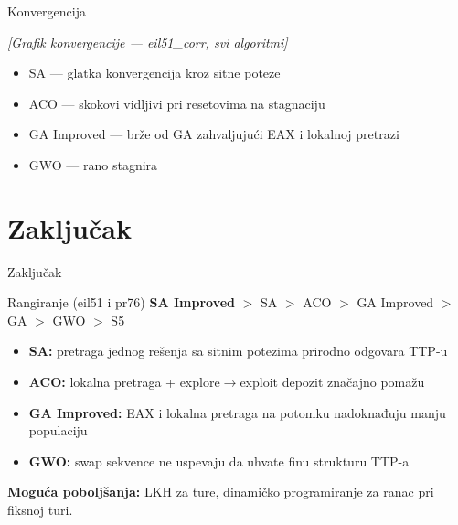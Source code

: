 \documentclass[aspectratio=169]{beamer}
\begin{document}
\begin{frame}{Konvergencija}
  \begin{center}
    \textit{[Grafik konvergencije --- eil51\_corr, svi algoritmi]}
  \end{center}

  \begin{itemize}
    \item SA --- glatka konvergencija kroz sitne poteze
    \item ACO --- skokovi vidljivi pri resetovima na stagnaciju
    \item GA Improved --- brže od GA zahvaljujući EAX i lokalnoj pretrazi
    \item GWO --- rano stagnira
  \end{itemize}
\end{frame}

\section{Zaključak}

\begin{frame}{Zaključak}
  \begin{block}{Rangiranje (eil51 i pr76)}
    \textbf{SA Improved} $>$ SA $>$ ACO $>$ GA Improved $>$ GA $>$ GWO $>$ S5
  \end{block}

  \bigskip
  \begin{itemize}
    \item \textbf{SA:} pretraga jednog rešenja sa sitnim potezima prirodno odgovara TTP-u
    \item \textbf{ACO:} lokalna pretraga + explore$\to$exploit depozit značajno pomažu
    \item \textbf{GA Improved:} EAX i lokalna pretraga na potomku nadoknađuju manju populaciju
    \item \textbf{GWO:} swap sekvence ne uspevaju da uhvate finu strukturu TTP-a
  \end{itemize}

  \bigskip
  \textbf{Moguća poboljšanja:} LKH za ture, dinamičko programiranje za ranac pri fiksnoj turi.
\end{frame}
\end{document}
